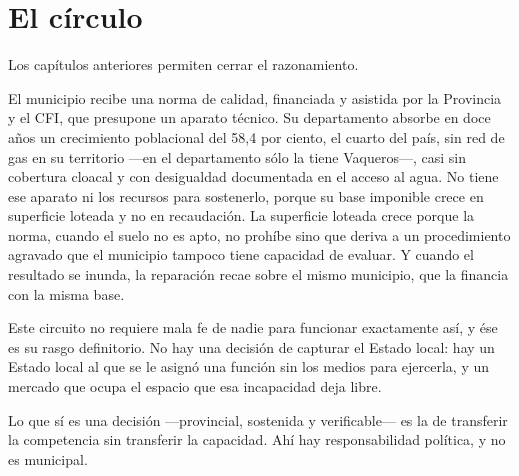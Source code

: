 \section{El círculo}

Los capítulos anteriores permiten cerrar el razonamiento.

El municipio recibe una norma de calidad, financiada y asistida por la Provincia y el CFI, que presupone un aparato técnico. Su departamento absorbe en doce años un crecimiento poblacional del 58,4 por ciento, el cuarto del país, sin red de gas en su territorio ---en el departamento sólo la tiene Vaqueros---, casi sin cobertura cloacal y con desigualdad documentada en el acceso al agua. No tiene ese aparato ni los recursos para sostenerlo, porque su base imponible crece en superficie loteada y no en recaudación. La superficie loteada crece porque la norma, cuando el suelo no es apto, no prohíbe sino que deriva a un procedimiento agravado que el municipio tampoco tiene capacidad de evaluar. Y cuando el resultado se inunda, la reparación recae sobre el mismo municipio, que la financia con la misma base.

Este circuito no requiere mala fe de nadie para funcionar exactamente así, y ése es su rasgo definitorio. No hay una decisión de capturar el Estado local: hay un Estado local al que se le asignó una función sin los medios para ejercerla, y un mercado que ocupa el espacio que esa incapacidad deja libre.

Lo que sí es una decisión ---provincial, sostenida y verificable--- es la de transferir la competencia sin transferir la capacidad. Ahí hay responsabilidad política, y no es municipal.

